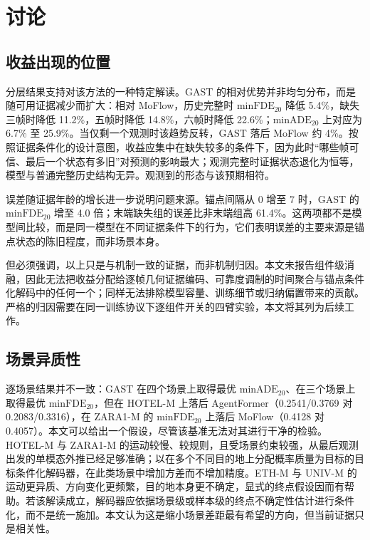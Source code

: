 \section{讨论}
\label{sec:disc}

\subsection{收益出现的位置}

分层结果支持对该方法的一种特定解读。GAST 的相对优势并非均匀分布，而是随可用证据减少而扩大：相对 MoFlow，历史完整时 $\mathrm{minFDE}_{20}$ 降低 5.4\%，缺失三帧时降低 11.2\%，五帧时降低 14.8\%，六帧时降低 22.6\%；$\mathrm{minADE}_{20}$ 上对应为 6.7\% 至 25.9\%。当仅剩一个观测时该趋势反转，GAST 落后 MoFlow 约 4\%。按照证据条件化的设计意图，收益应集中在缺失较多的条件下，因为此时“哪些帧可信、最后一个状态有多旧”对预测的影响最大；观测完整时证据状态退化为恒等，模型与普通完整历史结构无异。观测到的形态与该预期相符。

误差随证据年龄的增长进一步说明问题来源。锚点间隔从 0 增至 7 时，GAST 的 $\mathrm{minFDE}_{20}$ 增至 4.0 倍；末端缺失组的误差比非末端组高 61.4\%。这两项都不是模型间比较，而是同一模型在不同证据条件下的行为，它们表明误差的主要来源是锚点状态的陈旧程度，而非场景本身。

但必须强调，以上只是与机制一致的证据，而非机制归因。本文未报告组件级消融，因此无法把收益分配给逐帧几何证据编码、可靠度调制的时间聚合与锚点条件化解码中的任何一个；同样无法排除模型容量、训练细节或归纳偏置带来的贡献。严格的归因需要在同一训练协议下逐组件开关的四臂实验，本文将其列为后续工作。

\subsection{场景异质性}

逐场景结果并不一致：GAST 在四个场景上取得最优 $\mathrm{minADE}_{20}$、在三个场景上取得最优 $\mathrm{minFDE}_{20}$，但在 HOTEL-M 上落后 AgentFormer（0.2541/0.3769 对 0.2083/0.3316），在 ZARA1-M 的 $\mathrm{minFDE}_{20}$ 上落后 MoFlow（0.4128 对 0.4057）。本文可以给出一个假设，尽管该基准无法对其进行干净的检验。HOTEL-M 与 ZARA1-M 的运动较慢、较规则，且受场景约束较强，从最后观测出发的单模态外推已经足够准确；以在多个不同目的地上分配概率质量为目标的目标条件化解码器，在此类场景中增加方差而不增加精度。ETH-M 与 UNIV-M 的运动更异质、方向变化更频繁，目的地本身更不确定，显式的终点假设因而有帮助。若该解读成立，解码器应依据场景级或样本级的终点不确定性估计进行条件化，而不是统一施加。本文认为这是缩小场景差距最有希望的方向，但当前证据只是相关性。

